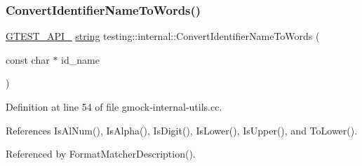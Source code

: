 \subsubsection{\texorpdfstring{Convert\+Identifier\+Name\+To\+Words()}{ConvertIdentifierNameToWords()}}
{\footnotesize\ttfamily \hyperlink{gtest-port_8h_aa73be6f0ba4a7456180a94904ce17790}{G\+T\+E\+S\+T\+\_\+\+A\+P\+I\+\_\+} \hyperlink{namespacetesting_1_1internal_a8e8ff5b11e64078831112677156cb111}{string} testing\+::internal\+::\+Convert\+Identifier\+Name\+To\+Words (\begin{DoxyParamCaption}\item[{const char $\ast$}]{id\+\_\+name }\end{DoxyParamCaption})}



Definition at line 54 of file gmock-\/internal-\/utils.\+cc.



References Is\+Al\+Num(), Is\+Alpha(), Is\+Digit(), Is\+Lower(), Is\+Upper(), and To\+Lower().



Referenced by Format\+Matcher\+Description().


